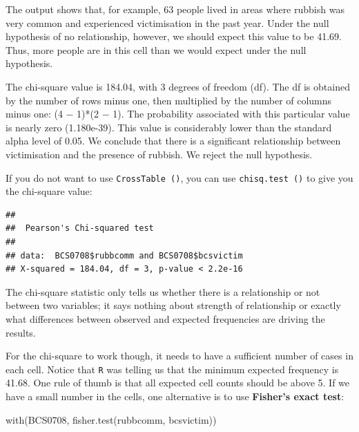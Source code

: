 \documentclass[
]{book}
\newenvironment{Shaded}{\begin{snugshade}}{\end{snugshade}}
\newcommand{\FunctionTok}[1]{\textcolor[rgb]{0.00,0.00,0.00}{#1}}
\newcommand{\NormalTok}[1]{#1}
\newcommand{\SpecialCharTok}[1]{\textcolor[rgb]{0.00,0.00,0.00}{#1}}
\begin{document}
The output shows that, for example, 63 people lived in areas where rubbish was very common and experienced victimisation in the past year. Under the null hypothesis of no relationship, however, we should expect this value to be 41.69. Thus, more people are in this cell than we would expect under the null hypothesis.

The chi-square value is 184.04, with 3 degrees of freedom (df). The df is obtained by the number of rows minus one, then multiplied by the number of columns minus one: (4 − 1)*(2 − 1). The probability associated with this particular value is nearly zero (1.180e-39). This value is considerably lower than the standard alpha level of 0.05. We conclude that there is a significant relationship between victimisation and the presence of rubbish. We reject the null hypothesis.

If you do not want to use \texttt{CrossTable\ ()}, you can use \texttt{chisq.test\ ()} to give you the chi-square value:

\begin{Shaded}
\end{Shaded}

\begin{verbatim}
## 
##  Pearson's Chi-squared test
## 
## data:  BCS0708$rubbcomm and BCS0708$bcsvictim
## X-squared = 184.04, df = 3, p-value < 2.2e-16
\end{verbatim}

The chi-square statistic only tells us whether there is a relationship or not between two variables; it says nothing about strength of relationship or exactly what differences between observed and expected frequencies are driving the results.

For the chi-square to work though, it needs to have a sufficient number of cases in each cell. Notice that \texttt{R} was telling us that the minimum expected frequency is 41.68. One rule of thumb is that all expected cell counts should be above 5. If we have a small number in the cells, one alternative is to use \textbf{Fisher's exact test}:

\begin{Shaded}
\begin{Highlighting}[]
\FunctionTok{with}\NormalTok{(BCS0708, }\FunctionTok{fisher.test}\NormalTok{(rubbcomm, bcsvictim))}
\end{Highlighting}
\end{Shaded}
\end{document}
